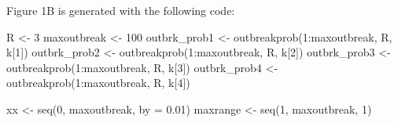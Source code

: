 \documentclass[
]{article}
\newenvironment{Shaded}{\begin{snugshade}}{\end{snugshade}}
\newcommand{\AttributeTok}[1]{\textcolor[rgb]{0.77,0.63,0.00}{#1}}
\newcommand{\DecValTok}[1]{\textcolor[rgb]{0.00,0.00,0.81}{#1}}
\newcommand{\FloatTok}[1]{\textcolor[rgb]{0.00,0.00,0.81}{#1}}
\newcommand{\FunctionTok}[1]{\textcolor[rgb]{0.00,0.00,0.00}{#1}}
\newcommand{\NormalTok}[1]{#1}
\newcommand{\OtherTok}[1]{\textcolor[rgb]{0.56,0.35,0.01}{#1}}
\newcommand{\SpecialCharTok}[1]{\textcolor[rgb]{0.00,0.00,0.00}{#1}}
\begin{document}
Figure 1B is generated with the following code:

\begin{Shaded}
\begin{Highlighting}[]
\NormalTok{R }\OtherTok{\textless{}{-}} \DecValTok{3}
\NormalTok{maxoutbreak }\OtherTok{\textless{}{-}} \DecValTok{100}
\NormalTok{outbrk\_prob1 }\OtherTok{\textless{}{-}} \FunctionTok{outbreakprob}\NormalTok{(}\DecValTok{1}\SpecialCharTok{:}\NormalTok{maxoutbreak, R, k[}\DecValTok{1}\NormalTok{])}
\NormalTok{outbrk\_prob2 }\OtherTok{\textless{}{-}} \FunctionTok{outbreakprob}\NormalTok{(}\DecValTok{1}\SpecialCharTok{:}\NormalTok{maxoutbreak, R, k[}\DecValTok{2}\NormalTok{])}
\NormalTok{outbrk\_prob3 }\OtherTok{\textless{}{-}} \FunctionTok{outbreakprob}\NormalTok{(}\DecValTok{1}\SpecialCharTok{:}\NormalTok{maxoutbreak, R, k[}\DecValTok{3}\NormalTok{])}
\NormalTok{outbrk\_prob4 }\OtherTok{\textless{}{-}} \FunctionTok{outbreakprob}\NormalTok{(}\DecValTok{1}\SpecialCharTok{:}\NormalTok{maxoutbreak, R, k[}\DecValTok{4}\NormalTok{])}

\NormalTok{xx }\OtherTok{\textless{}{-}} \FunctionTok{seq}\NormalTok{(}\DecValTok{0}\NormalTok{, maxoutbreak, }\AttributeTok{by =} \FloatTok{0.01}\NormalTok{)}
\NormalTok{maxrange }\OtherTok{\textless{}{-}} \FunctionTok{seq}\NormalTok{(}\DecValTok{1}\NormalTok{, maxoutbreak, }\DecValTok{1}\NormalTok{)}


\end{Highlighting}
\end{Shaded}
\end{document}
